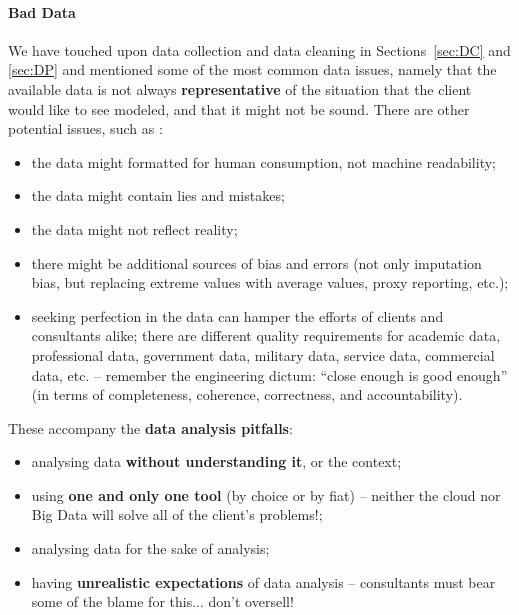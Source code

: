 \paragraph{Bad Data}
We have touched upon data collection and data cleaning in Sections~\ref{sec:DC} and \ref{sec:DP} and mentioned some of the most common data issues, namely that the available data is not always \textbf{representative} of the situation that the client would like to see modeled, and that it might not be sound. There are other potential issues, such as \cite{DSML_BDH}:
\begin{itemize}[noitemsep]
\item the data might formatted for human consumption, not machine readability;
\item the data might contain lies and mistakes;
\item the data might not reflect reality;
\item there might be additional sources of bias and errors (not only imputation bias, but replacing extreme values with average values, proxy  reporting, etc.);
\item seeking perfection in the data can hamper the efforts of clients and consultants alike; there are different quality requirements for academic data, professional data, government data, military data, service data, commercial data, etc. -- remember the engineering dictum: ``close enough is good enough'' (in terms of completeness, coherence, correctness, and accountability).
\end{itemize}
These accompany the \textbf{data analysis pitfalls}: 
\begin{itemize}[noitemsep]
\item analysing data \textbf{without understanding it}, or the context;
\item using \textbf{one and only one tool} (by choice or by fiat) -- neither the cloud nor Big Data will solve all of the client's problems!;
\item analysing data for the sake of analysis;
\item having \textbf{unrealistic expectations} of data analysis -- consultants must bear some of the blame for this... don't oversell!
\end{itemize}
